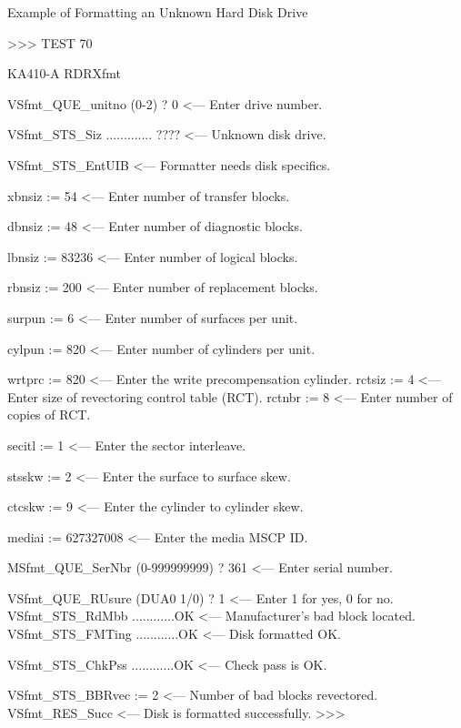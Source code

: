 \begin{ttfig}{Example of Formatting an Unknown Hard Disk Drive}

>>> TEST 70

                       KA410-A  RDRXfmt

VSfmt_QUE_unitno (0-2) ?  0          <--- Enter drive number.

VSfmt_STS_Siz ............. ????     <--- Unknown disk drive.

VSfmt_STS_EntUIB    <--- Formatter needs disk specifics.

xbnsiz := 54        <--- Enter number of transfer blocks.

dbnsiz := 48        <--- Enter number of diagnostic blocks.

lbnsiz := 83236     <--- Enter number of logical blocks.

rbnsiz := 200       <--- Enter number of replacement blocks.

surpun := 6         <--- Enter number of surfaces per unit.

cylpun := 820       <--- Enter number of cylinders per unit.

wrtprc := 820       <--- Enter the write precompensation
                         cylinder.
rctsiz := 4         <--- Enter size of revectoring control
                         table (RCT).
rctnbr := 8         <--- Enter number of copies of RCT.

secitl := 1         <--- Enter the sector interleave.

stsskw := 2         <--- Enter the surface to surface skew.

ctcskw := 9         <--- Enter the cylinder to cylinder skew.

mediai := 627327008      <--- Enter the media MSCP ID.

MSfmt_QUE_SerNbr (0-999999999) ? 361 <--- Enter serial number.

VSfmt_QUE_RUsure (DUA0 1/0) ? 1      <--- Enter 1 for yes,
                                          0 for no.
VSfmt_STS_RdMbb ............OK       <--- Manufacturer's bad
                                          block located.
VSfmt_STS_FMTing ............OK      <--- Disk formatted OK.

VSfmt_STS_ChkPss ............OK      <--- Check pass is OK.

VSfmt_STS_BBRvec := 2                <--- Number of bad blocks
                                          revectored.
VSfmt_RES_Succ                       <--- Disk is formatted
                                          successfully.
>>>
\end{ttfig}

